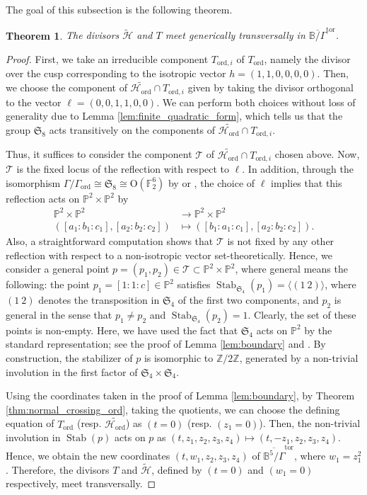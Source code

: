 \documentclass[12pt, pdftex]{amsart}
\theoremstyle{plain}
\newtheorem{thm}{Theorem}[section]
\theoremstyle{definition}
\numberwithin{equation}{section}
\def\Z{{\mathbb Z}}
\def\P{{\mathbb P}}
\def\B{{\mathbb B}}
\def\SS{{\mathfrak S}}
\def\Stab{\mathop{\mathrm{Stab}}\nolimits}
\def\ord{\mathrm{ord}}
\def\tor{\mathrm{tor}}
\def\H{\mathscr{H}}
\def\l{\langle}
\def\r{\rangle}
\def\O{\mathrm{O}}
\begin{document}
The goal of this subsection is the following theorem.
\begin{thm}
\label{thm:nonord_transversal}
The divisors $\widetilde{\H}$ and $T$ meet generically transversally in $\overline{\B/\Gamma}^{\tor}$.
\end{thm}
\begin{proof}
First, we take an irreducible component $T_{\ord,i}$ of $T_{\ord}$, namely the divisor over the cusp corresponding to the isotropic vector $h=(1,1,0,0,0,0)$.  
Then, we choose the component of $\widetilde{\H_{\ord}}\cap T_{\ord,i}$ given by taking the divisor orthogonal to the vector $\ell=(0,0,1,1,0,0)$. We can perform both choices without loss of generality due to 
Lemma \ref{lem:finite_quadratic_form}, which tells us that the group $\SS_8$ acts transitively on the components of $\widetilde{\H_{\ord}}\cap T_{\ord,i}$.


Thus, it suffices to consider the component $\mathcal{T}$ of $\widetilde{\H_{\ord}}\cap T_{\ord,i}$ chosen above. 
Now, $\mathcal{T}$ is the fixed locus of the reflection with respect to $\ell$.
In addition, through the isomorphism $\Gamma/\Gamma_{\ord}\cong\SS_8\cong\O(\mathbb{F}_2^6)$ by \cite[Section 3]{FM11} or \cite[Proposition 3.2]{MT04}, the choice of $\ell$ implies that this reflection acts on $\P^2\times\P^2$ by \begin{align*}
\P^2\times\P^2&\to\P^2\times\P^2\\
    ([a_1:b_1:c_1],[a_2:b_2:c_2])&\mapsto ([b_1:a_1:c_1],[a_2:b_2:c_2]).
\end{align*}
Also, a straightforward computation shows that  $\mathcal{T}$ is not fixed by any other reflection with respect to a non-isotropic vector set-theoretically. 
Hence, we consider a general point $p=(p_1,p_2)\in\mathcal{T}\subset\P^2\times\P^2$, where general means the following: the point $p_1=[1:1:c] \in \P^2$ satisfies $\Stab_{\SS_4}(p_1)=\l(1\ 2)\r$, where $(1\ 2)$ denotes the transposition in $\SS_4$ of the first two components, 
and $p_2$ is general in the sense that $p_1\neq p_2$ and $\Stab_{\SS_4}(p_2)=1$.
Clearly, the set of these points is non-empty.
Here, we have used the fact that $\SS_4$ acts on $\P^2$ by the standard representation; see the proof of Lemma  \ref{lem:boundary} and  \cite[Subsection 3.2]{Do08}.
By construction, the stabilizer of $p$ is isomorphic to $\Z/2\Z$, generated by a non-trivial involution in the first factor of $\SS_4\times\SS_4$.

Using the coordinates taken in the proof of Lemma \ref{lem:boundary}, 
by Theorem \ref{thm:normal_crossing_ord}, taking the quotients, we can choose the defining equation of $T_{\ord}$ (resp. $\widetilde{\H_{\ord}}$) as $(t=0)$ (resp. $(z_1=0)$).
Then, the non-trivial involution in $\Stab(p)$ acts on $p$ as $(t,z_1,z_2,z_3,z_4)\mapsto (t,-z_1,z_2,z_3,z_4)$.
Hence, we obtain the new coordinates $(t, w_1, z_2, z_3, z_4)$ of $\overline{\B^5/\Gamma}^{\tor}$, where $w_1=z_1^2$.
Therefore, the divisors $T$ and $\widetilde{\H}$, defined by $(t=0)$ and $(w_1=0)$ respectively, meet transversally.

\end{proof}
\end{document}
